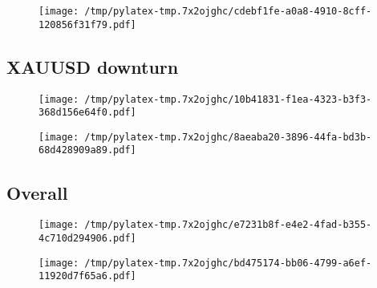\documentclass{article}%
\begin{document}
%


\begin{figure}[htbp]%
\centering%
\texttt{[image: /tmp/pylatex-tmp.7x2ojghc/cdebf1fe-a0a8-4910-8cff-120856f31f79.pdf]}%
\end{figure}

%
\newpage %
\subsection{XAUUSD downturn}%
\label{subsec:XAUUSDdownturn}%


\begin{figure}[htbp]%
\centering%
\texttt{[image: /tmp/pylatex-tmp.7x2ojghc/10b41831-f1ea-4323-b3f3-368d156e64f0.pdf]}%
\end{figure}

%


\begin{figure}[htbp]%
\centering%
\texttt{[image: /tmp/pylatex-tmp.7x2ojghc/8aeaba20-3896-44fa-bd3b-68d428909a89.pdf]}%
\end{figure}

%
\newpage %
\subsection{Overall}%
\label{subsec:Overall}%


\begin{figure}[htbp]%
\centering%
\texttt{[image: /tmp/pylatex-tmp.7x2ojghc/e7231b8f-e4e2-4fad-b355-4c710d294906.pdf]}%
\end{figure}

%


\begin{figure}[htbp]%
\centering%
\texttt{[image: /tmp/pylatex-tmp.7x2ojghc/bd475174-bb06-4799-a6ef-11920d7f65a6.pdf]}%
\end{figure}

%
\end{document}
